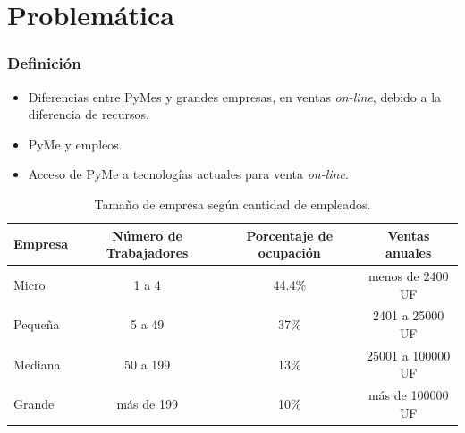 \documentclass[10pt, compress]{beamer}
\begin{document}
\section{Problemática}
\begin{frame}
\frametitle{Definición}
        \begin{itemize}[<+- | alert@+>]
          \item Diferencias entre PyMes y grandes empresas, en ventas \emph{on-line}, debido a la diferencia de recursos.
	  \item PyMe y empleos.
	  \item Acceso de PyMe a tecnologías actuales para venta \emph{on-line}.
        \end{itemize}

\begin{table}[h]
\footnotesize
\centering
\begin{tabular}{|l|c|c|c|}
\hline
{\bf Empresa}  & {\bf Número de Trabajadores} & {\bf Porcentaje de ocupación} & {\bf Ventas anuales}\\
\hline
Micro    & 1 a 4                & 44.4\%  & menos de 2400 UF\\
\hline
Pequeña  & 5 a 49               & 37\%  & 2401 a 25000 UF\\
\hline
Mediana  & 50 a 199             & 13\%  & 25001 a 100000 UF\\
\hline
Grande   & más de 199           & 10\%  & más de 100000 UF\\
\hline
\end{tabular}
\caption{Tamaño de empresa según cantidad de empleados.}
\label{tab:tam_empresa}
\end{table}
\end{frame}
\end{document}
